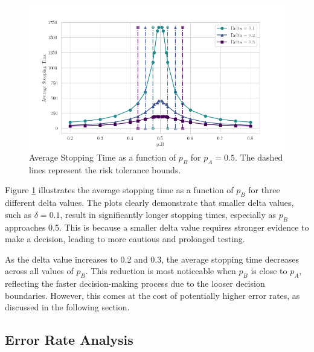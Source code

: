 \documentclass[magisterska, english]{pwr_wmat_praca_dyplomowa}
\theoremstyle{plain}
\numberwithin{theorem}{chapter}
\theoremstyle{definition}
\numberwithin{theorem}{chapter}
\begin{document}
\begin{figure}[H]
	\centering
	\includegraphics[width=\textwidth]{images/delta_average_stopping_time.png}
	\caption{Average Stopping Time as a function of \( p_B \) for \( p_A = 0.5 \). The dashed lines represent the risk tolerance bounds.}
	\label{fig:avg_stopping_time_pa05}
\end{figure}

Figure \ref{fig:avg_stopping_time_pa05} illustrates the average stopping time as a function of \( p_B \) for three different delta values. The plots clearly demonstrate that smaller delta values, such as \( \delta = 0.1 \), result in significantly longer stopping times, especially as \( p_B \) approaches 0.5. This is because a smaller delta value requires stronger evidence to make a decision, leading to more cautious and prolonged testing.

As the delta value increases to 0.2 and 0.3, the average stopping time decreases across all values of \( p_B \). This reduction is most noticeable when \( p_B \) is close to \( p_A \), reflecting the faster decision-making process due to the looser decision boundaries. However, this comes at the cost of potentially higher error rates, as discussed in the following section.

\subsection{Error Rate Analysis}
\end{document}
